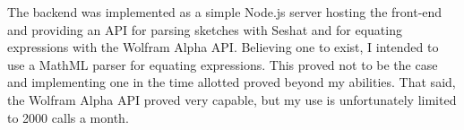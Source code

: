 \documentclass{abrice}
\begin{document}
The backend was implemented as a simple Node.js server hosting the front-end and
providing an API for parsing sketches with Seshat and for equating expressions
with the Wolfram Alpha API. Believing one to exist, I intended to use a MathML
parser for equating expressions. This proved not to be the case and implementing
one in the time allotted proved beyond my abilities. That said, the Wolfram
Alpha API proved very capable, but my use is unfortunately limited to 2000 calls
a month.
\end{document}
